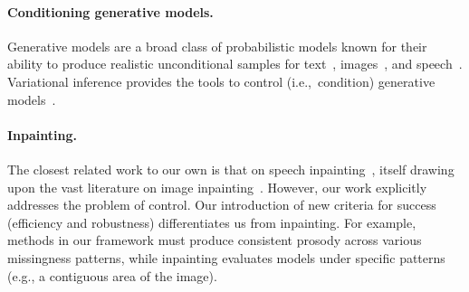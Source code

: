 \documentclass[../thesis.tex]{subfiles}
\begin{document}
\paragraph{Conditioning generative models.} Generative models are a broad class of probabilistic models known for their ability to produce realistic unconditional samples for text~\citep{brownLanguageModelsAre2020a}, images~\citep{rombachHighresolutionImageSynthesis2022,rameshHierarchicalTextconditionalImage2022}, and speech~\citep{vandenoordNeuralDiscreteRepresentation2017}. Variational inference provides the tools to control (i.e.,\ condition) generative models~\citep{sohnLearningStructuredOutput2015,mirza2014conditional,winklerLearningLikelihoodsConditional2020}.

\paragraph{Inpainting.} The closest related work to our own is that on speech inpainting~\citep{borsosSpeechPainterTextconditionedSpeech2022}, itself drawing upon the vast literature on image inpainting~\citep{elharroussImageInpaintingReview2020}. However, our work explicitly addresses the problem of control.  Our introduction of new criteria for success (efficiency and robustness) differentiates us from inpainting.  For example, methods in our framework must produce consistent prosody across various missingness patterns, while inpainting evaluates models under specific patterns (e.g., a contiguous area of the image). 





\end{document}
